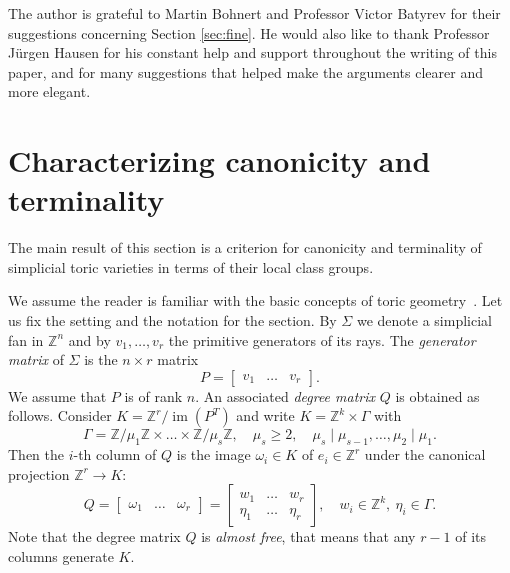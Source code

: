 \documentclass{amsart}
\newcommand{\Z}{\mathbb{Z}}
\DeclareMathOperator{\im}{im}
\theoremstyle{plain}
\theoremstyle{definition}
\begin{document}
The author is grateful to Martin Bohnert and Professor Victor Batyrev for their suggestions concerning Section \ref{sec:fine}. He would also like to thank Professor Jürgen Hausen for his constant help and support throughout the writing of this paper, and for many suggestions that helped make the arguments clearer and more elegant.

\tableofcontents

\section{Characterizing canonicity and terminality}\label{sec:general}

The main result of this section is a criterion for canonicity and terminality of simplicial toric varieties in terms of their local class groups.

We assume the reader is familiar with the basic concepts
of toric geometry~\cite{CoxLittleSchenck}.
Let us fix the setting and the notation for the section.
By $\Sigma$ we denote a simplicial fan in $\Z^n$ and
by $v_1,\dots,v_r$ the primitive generators of its rays.
The \emph{generator matrix} of $\Sigma$ is the $n\times r$ matrix
$$
P=\begin{bmatrix}
    v_1 & \dots & v_r
\end{bmatrix}.
$$
We assume that $P$ is of rank $n$. An associated \emph{degree matrix}
$Q$ is obtained as follows. Consider $K=\Z^r/\im(P^T)$ and write
$K=\Z^k\times\Gamma$ with 
$$
\Gamma=\Z/\mu_1\Z\times\dots\times\Z/\mu_s\Z,
\quad
\mu_s\geq 2,
\quad
\mu_s\mid\mu_{s-1},\dots,\mu_2\mid\mu_1.
$$
Then the $i$-th column of $Q$ is the image $\omega_i \in K$ of $e_i\in\Z^r$
under the canonical projection $\Z^r \to K$:
$$
Q
=
\begin{bmatrix}
    \omega_1 & \dots & \omega_r
\end{bmatrix}
=
\begin{bmatrix}
 w_1 & \dots & w_r \\ \eta_1 & \dots & \eta_r
\end{bmatrix},
\quad
w_i\in\Z^k, \ \eta_i\in\Gamma.
$$
Note that the degree matrix $Q$ is \emph{almost free}, that means
that any $r-1$ of its columns generate $K$.
\end{document}
